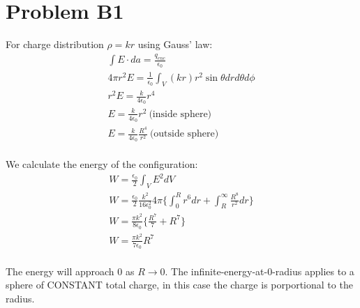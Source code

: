 \documentclass[a4paper,11pt]{article}
\numberwithin{equation}{section}
\begin{document}
\section{Problem B1}
For charge distribution $\rho=kr$ using Gauss' law:
\begin{gather}
 \int E \cdot da = \frac{q_{enc}}{\epsilon_0}\\
 4\pi r^2 E= \frac{1}{\epsilon_0}\int_V (kr) r^2 \sin{\theta} dr d\theta d\phi\\
 r^2 E = \frac{k}{4 \epsilon_0}r^4\\
 E = \frac{k}{4 \epsilon_0}r^2 \ \text{(inside sphere)}\\
 E = \frac{k}{4 \epsilon_0}\frac{R^4}{r^2} \ \text{(outside sphere)}
\end{gather}
\\
We calculate the energy of the configuration:
\begin{gather}
 W = \frac{\epsilon_0}{2}\int_V E^2 dV\\
 W = \frac{\epsilon_0}{2}\frac{k^2}{16 \epsilon_0^2}4\pi\{\int_0^Rr^6 dr+\int_R^\infty \frac{R^8}{r^2} dr\} \\
 W = \frac{\pi k^2}{8 \epsilon_0}\{\frac{R^7}{7}+R^7 \}\\
 W = \frac{\pi k^2}{7 \epsilon_0}R^7
\end{gather}
\\
The energy will approach 0 as $R \rightarrow 0$. 
The infinite-energy-at-0-radius applies to a sphere of CONSTANT total charge, in this case the charge is porportional to the radius.
\end{document}
